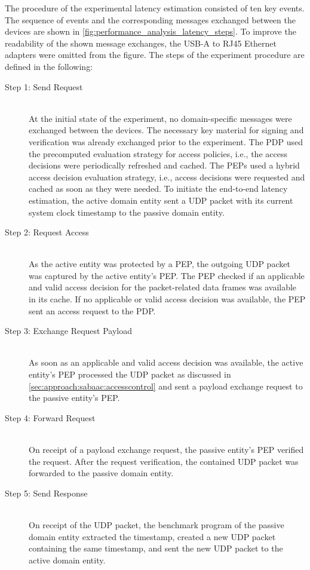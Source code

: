 The procedure of the experimental latency estimation consisted of ten key events.
The sequence of events and the corresponding messages exchanged between the devices are shown in \autoref{fig:performance_analysis_latency_steps}.
To improve the readability of the shown message exchanges, the USB-A to RJ45 Ethernet adapters were omitted from the figure.
The steps of the experiment procedure are defined in the following:
\begin{description}
    \item[Step 1: Send Request]~\\
    At the initial state of the experiment, no domain-specific messages were exchanged between the devices.
    The necessary key material for signing and verification was already exchanged prior to the experiment.
    The PDP used the precomputed evaluation strategy for access policies, i.e., the access decisions were periodically refreshed and cached.
    The PEPs used a hybrid access decision evaluation strategy, i.e., access decisions were requested and cached as soon as they were needed.
    To initiate the end-to-end latency estimation, the active domain entity sent a UDP packet with its current system clock timestamp to the passive domain entity.

    \item[Step 2: Request Access]~\\
    As the active entity was protected by a PEP, the outgoing UDP packet was captured by the active entity's PEP.
    The PEP checked if an applicable and valid access decision for the packet-related data frames was available in its cache.
    If no applicable or valid access decision was available, the PEP sent an access request to the PDP.

    \item[Step 3: Exchange Request Payload]~\\
    As soon as an applicable and valid access decision was available, the active entity's PEP processed the UDP packet as discussed in \autoref{sec:approach:sabaac:accesscontrol} and sent a payload exchange request to the passive entity's PEP.

    \item[Step 4: Forward Request]~\\
    On receipt of a payload exchange request, the passive entity's PEP verified the request.
    After the request verification, the contained UDP packet was forwarded to the passive domain entity.

    \item[Step 5: Send Response]~\\
    On receipt of the UDP packet, the benchmark program of the passive domain entity extracted the timestamp, created a new UDP packet containing the same timestamp, and sent the new UDP packet to the active domain entity.


\end{description}
